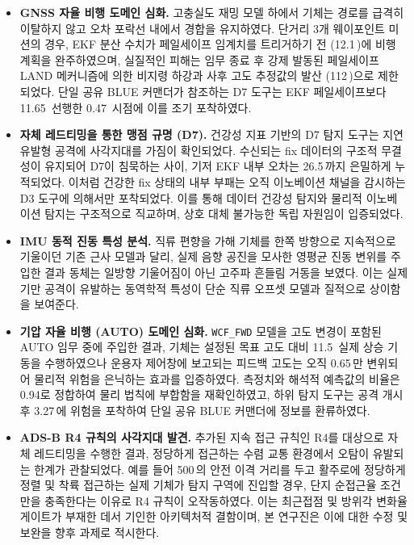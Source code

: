 \begin{itemize}[leftmargin=*]
    \item \textbf{GNSS 자율 비행 도메인 심화.} 고충실도 재밍 모델 하에서 기체는 경로를 급격히 이탈하지 않고 오차 포락선 내에서 경합을 유지하였다. 단거리 3개 웨이포인트 미션의 경우, EKF 분산 수치가 페일세이프 임계치를 트리거하기 전 (12.1\,)에 비행 계획을 완주하였으며, 실질적인 피해는 임무 종료 후 강제 발동된 페일세이프 LAND 메커니즘에 의한 비지령 하강과 사후 고도 추정값의 발산 (112\,)으로 제한되었다. 단일 공유 BLUE 커맨더가 참조하는 D7 도구는 EKF 페일세이프보다 11.65\, 선행한 0.47\, 시점에 이를 조기 포착하였다.

    \item \textbf{자체 레드티밍을 통한 맹점 규명 (D7).} 건강성 지표 기반의 D7 탐지 도구는 지연 유발형 공격에 사각지대를 가짐이 확인되었다. 수신되는 fix 데이터의 구조적 무결성이 유지되어 D7이 침묵하는 사이, 기저 EKF 내부 오차는 26.5\,까지 은밀하게 누적되었다. 이처럼 건강한 fix 상태의 내부 부패는 오직 이노베이션 채널을 감시하는 D3 도구에 의해서만 포착되었다. 이를 통해 데이터 건강성 탐지와 물리적 이노베이션 탐지는 구조적으로 직교하며, 상호 대체 불가능한 독립 자원임이 입증되었다.

    \item \textbf{IMU 동적 진동 특성 분석.} 직류 편향을 가해 기체를 한쪽 방향으로 지속적으로 기울이던 기존 근사 모델과 달리, 실제 음향 공진을 모사한 영평균 진동 변위를 주입한 결과 동체는 일방향 기울어짐이 아닌 고주파 흔들림 거동을 보였다. 이는 실제 기만 공격이 유발하는 동역학적 특성이 단순 직류 오프셋 모델과 질적으로 상이함을 보여준다.

    \item \textbf{기압 자율 비행 (AUTO) 도메인 심화.} \texttt{WCF\_FWD} 모델을 고도 변경이 포함된 AUTO 임무 중에 주입한 결과, 기체는 설정된 목표 고도 대비 11.5\, 실제 상승 기동을 수행하였으나 운용자 제어창에 보고되는 피드백 고도는 오직 0.65\,만 변위되어 물리적 위험을 은닉하는 효과를 입증하였다. 측정치와 해석적 예측값의 비율은 0.94로 정합하여 물리 법칙에 부합함을 재확인하였고, 하위 탐지 도구는 공격 개시 후 3.27\,에 위험을 포착하여 단일 공유 BLUE 커맨더에 정보를 환류하였다.

    \item \textbf{ADS-B R4 규칙의 사각지대 발견.} 추가된 지속 접근 규칙인 R4를 대상으로 자체 레드티밍을 수행한 결과, 정당하게 접근하는 수렴 교통 환경에서 오탐이 유발되는 한계가 관찰되었다. 예를 들어 500\,의 안전 이격 거리를 두고 활주로에 정당하게 정렬 및 착륙 접근하는 실제 기체가 탐지 구역에 진입할 경우, 단지 순접근율 조건만을 충족한다는 이유로 R4 규칙이 오작동하였다. 이는 최근접점 및 방위각 변화율 게이트가 부재한 데서 기인한 아키텍처적 결함이며, 본 연구진은 이에 대한 수정 및 보완을 향후 과제로 적시한다.


\end{itemize}
